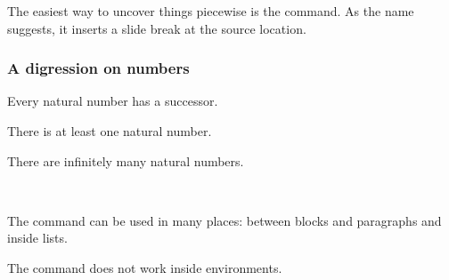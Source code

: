The easiest way to uncover things piecewise is the  command.
As the name suggests, it inserts a slide break at the source location.
%
\begin{ExampleCode}
\begin{frame}
\frametitle{A digression on numbers}

\begin{theorem}
Every natural number has a successor.
\end{theorem}

\pause

\begin{theorem}
There is at least one natural number.
\end{theorem}

\pause

\begin{corollary}
There are infinitely many natural numbers.
\end{corollary}
\end{frame}
\end{ExampleCode}
%
\begin{center}
~
~
\end{center}

The  command can be used in many places:
between blocks and paragraphs and inside lists.

\begin{gotcha}
The  command does not work inside  environments.
\end{gotcha}

